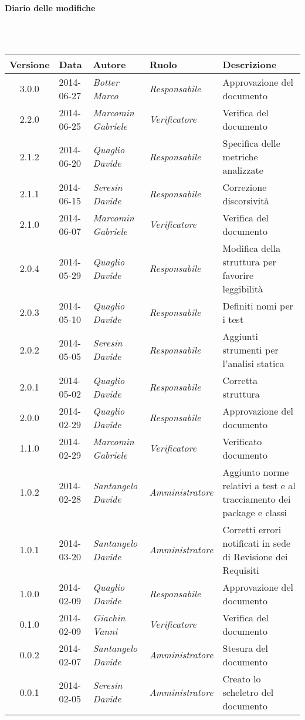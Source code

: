 \noindent\begin{Large}\textbf{Diario delle modifiche}\end{Large}\\
\\
\begin{small}
\begin{tabular}{|c|p{1.8cm}|p{2.8cm}|p{2.8cm}|p{3.5cm}|}
\hline
Versione & Data & Autore & Ruolo & Descrizione \\
\hline
3.0.0 & 2014-06-27 & \textit{Botter Marco} & \textit{Responsabile} & Approvazione del documento\\
\hline
2.2.0 & 2014-06-25 & \textit{Marcomin Gabriele} & \textit{Verificatore} & Verifica del documento\\
\hline
2.1.2 & 2014-06-20 & \textit{Quaglio Davide} & \textit{Responsabile} & Specifica delle metriche analizzate\\
\hline
2.1.1 & 2014-06-15 & \textit{Seresin Davide} & \textit{Responsabile} & Correzione discorsività\\
\hline
2.1.0 & 2014-06-07 & \textit{Marcomin Gabriele} & \textit{Verificatore} & Verifica del documento\\
\hline
2.0.4 & 2014-05-29 & \textit{Quaglio Davide} & \textit{Responsabile} & Modifica della struttura per favorire leggibilità\\
\hline
2.0.3 & 2014-05-10 & \textit{Quaglio Davide} & \textit{Responsabile} & Definiti nomi per i test\\
\hline
2.0.2 & 2014-05-05 & \textit{Seresin Davide} & \textit{Responsabile} & Aggiunti strumenti per l'analisi statica\\
\hline
2.0.1 & 2014-05-02 & \textit{Quaglio Davide} & \textit{Responsabile} & Corretta struttura\\
\hline
2.0.0 & 2014-02-29 & \textit{Quaglio Davide} & \textit{Responsabile} & Approvazione del documento\\
\hline
1.1.0 & 2014-02-29 & 
\textit{Marcomin Gabriele} &
\textit{Verificatore} & Verificato documento\\
\hline
1.0.2 & 2014-02-28 & 
\textit{Santangelo Davide} &
\textit{Amministratore} &  Aggiunto norme relativi a test e al tracciamento dei package e classi\\
\hline
1.0.1 & 2014-03-20 & 
\textit{Santangelo Davide} &
\textit{Amministratore} &  Corretti errori notificati in sede di Revisione dei Requisiti\\
\hline
1.0.0 & 2014-02-09 & 
\textit{Quaglio Davide} &
\textit{Responsabile} &  Approvazione del documento\\
\hline
0.1.0 & 2014-02-09 & 
\textit{Giachin Vanni} &
\textit{Verificatore} &  Verifica del documento\\
\hline
0.0.2 & 2014-02-07 & 
\textit{Santangelo Davide} &
\textit{Amministratore} &  Stesura del documento\\
\hline
0.0.1 & 2014-02-05 & 
\textit{Seresin Davide} &
\textit{Amministratore} &  Creato lo scheletro del documento\\
\hline
\end{tabular}\\
\end{small}